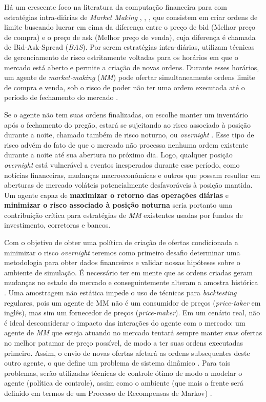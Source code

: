Há um crescente foco na literatura da computação financeira para com estratégias intra-diárias de \textit{Market Making} \citep{WOS:000963297000001} \citep{Gueant2017} \citep{selser2021optimal} \citep{Ganesh2019}, \citep{WOS:000747190900001}, \citep{WOS:000718533100001}, que consistem em criar ordens de limite buscando lucrar em cima da diferença entre o preço de bid (Melhor preço de compra) e o preço de ask (Melhor preço de venda), cuja diferença é chamada de Bid-Ask-Spread (\textit{BAS}). Por serem estratégias intra-diárias, utilizam técnicas de gerenciamento de risco estritamente voltadas para os horários em que o mercado está aberto e permite a criação de novas ordens. Durante esses horários, um agente de \textit{market-making} (\textit{MM}) pode ofertar simultaneamente ordens limite de compra e venda, sob o risco de poder não ter uma ordem executada até o período de fechamento do mercado \citep{Gueant2012} \citep{selser2021optimal} \citep{bakshaev2020marketmaking}.

Se o agente não tem suas ordens finalizadas, ou escolhe manter um inventário após o fechamento do pregão, estará se sujeitando ao risco associado à posição durante a noite, chamado também de risco noturno, ou \textit{overnight} \citep{Gueant2012}. Esse tipo de risco advém do fato de que o mercado não processa nenhuma ordem existente durante a noite até sua abertura no próximo dia. Logo, qualquer posição \textit{overnight} está vulnerável a eventos inesperados durante esse período, como notícias financeiras, mudanças macroeconômicas e outros que possam resultar em aberturas de mercado voláteis potencialmente desfavoráveis à posição mantida. Um agente capaz de \textbf{maximizar o retorno das operações diárias} e \textbf{minimizar o risco associado à posição noturna} seria portanto uma contribuição crítica para estratégias de \textit{MM} existentes usadas por fundos de investimento, corretoras e bancos.

Com o objetivo de obter uma política de criação de ofertas condicionada a minimizar o risco \textit{overnight} teremos como primeiro desafio determinar uma metodologia para obter dados financeiros e validar nossas hipóteses sobre o ambiente de simulação. É necessário ter em mente que as ordens criadas geram mudanças no estado do mercado e conseguintemente alteram a amostra histórica \citep{WOS:000903090100001}. Uma amostragem não estática impede o uso de técnicas para \textit{backtesting} regulares, pois um agente de MM não é um consumidor de preços (\textit{price-taker} em inglês), mas sim um fornecedor de preços (\textit{price-maker}). Em um cenário real, não é ideal desconsiderar o impacto das interações do agente com o mercado: um agente de \textit{MM} que esteja atuando no mercado tentará sempre manter suas ofertas no melhor patamar de preço possível, de modo a ter suas ordens executadas primeiro. Assim, o envio de novas ofertas afetará as ordens subsequentes deste outro agente, o que define um problema de sistema dinâmico \citep{Gueant2017}. Para tais problemas, serão utilizadas técnicas de controle ótimo de modo a modelar o agente (política de controle), assim como o ambiente (que mais a frente será definido em termos de um Processo de Recompensas de Markov) \citep{Gasperov2021}.

